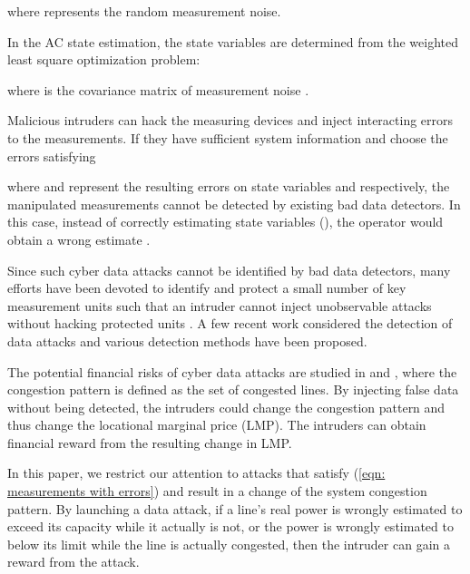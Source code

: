 \documentclass[conference,letterpaper,10pt]{IEEEtran}
\begin{document}
where  represents the random measurement noise.


In the AC state estimation, the state variables are determined from the weighted least square optimization problem:

where  is the covariance matrix of measurement noise .

Malicious intruders can hack the measuring devices and inject interacting errors to the measurements. If they have sufficient system information and choose the errors  satisfying

where  and  represent the resulting errors on state variables  and  respectively, the manipulated measurements cannot be detected by existing bad data detectors. In this case, instead of correctly estimating state variables (), the operator would obtain a wrong estimate .




Since such cyber data attacks cannot be identified by   bad data detectors, 
many efforts have been devoted to identify and protect  a small number of key measurement units such that an intruder cannot inject unobservable attacks without hacking protected units  \cite{BRWKNO10,DS10,KP11}. A few recent work \cite{SJ13,LEDEH14,WGGCFSR14} considered the detection of data attacks and various detection methods have been proposed.

The potential financial risks of cyber data attacks are studied in \cite{XMS11} and \cite{JKT14}, where the congestion pattern is defined as the set of congested lines.  By injecting false data without being detected, the intruders could change the congestion pattern and thus change the locational marginal price (LMP). The intruders can obtain financial reward from the resulting change in LMP. 

In this paper, we restrict our attention to attacks that satisfy (\ref{eqn: measurements with errors}) and result in a change of the system congestion pattern. By launching a data attack, if a line's real power is wrongly estimated to exceed its capacity while it actually is not, or the power is wrongly estimated to below its limit while the line is actually congested, then the intruder can gain a reward from the attack. 
\end{document}
